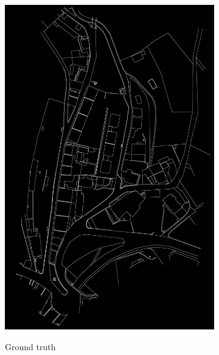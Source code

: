 \documentclass[12pt]{article}
\begin{document}
\begin{figure}[H]
\begin{subfigure}[b]{.32\textwidth}
		\includegraphics[width=1\linewidth]{images/original_gt2.png}  
		\label{fig:original-gt}
		\caption{Ground truth}
	\end{subfigure}
	\begin{subfigure}[b]{.32\textwidth}
		\centering

\end{subfigure}
\end{figure}
\end{document}
